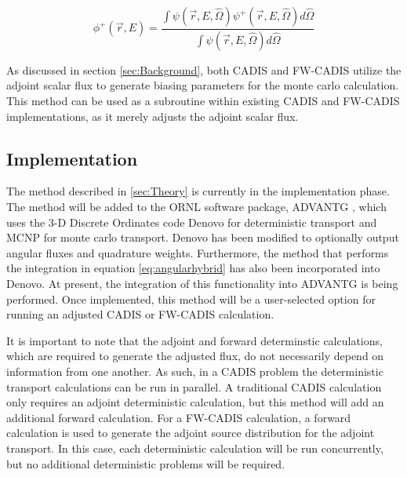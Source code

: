 \documentclass{mc2015}
\begin{document}
\begin{equation} 
\label{eq:angularhybrid}
\phi^{+}(\vec{r},E) = \frac{\int \psi(\vec {r} ,E,\hat{\Omega})\psi^+(\vec {r} ,E,\hat{\Omega})d\hat\Omega }{\int\psi(\vec {r} ,E,\hat{\Omega})d\hat\Omega}
\end{equation}

As discussed in section \ref{sec:Background}, both CADIS and FW-CADIS utilize the adjoint scalar flux to generate biasing parameters for the monte carlo calculation. 
This method can be used as a subroutine within existing CADIS and FW-CADIS implementations, as it merely adjusts the adjoint scalar flux.  

\subsection{Implementation}
\label{sec:Implement}

The method described in \ref{sec:Theory} is currently in the implementation phase. The method will be added to the ORNL software package, ADVANTG \cite{mosher_new_2010}, which uses the 3-D Discrete Ordinates code Denovo \cite{evans_denovo:_2010} for deterministic transport and MCNP \cite{brown_mcnp_2002} for monte carlo transport. Denovo has been modified to optionally output angular fluxes and quadrature weights. Furthermore, the method that performs the integration in equation \ref{eq:angularhybrid} has also been incorporated into Denovo. At present, the integration of this functionality into ADVANTG is being performed. Once implemented, this method will be a user-selected option for running an adjusted CADIS or FW-CADIS calculation. 

It is important to note that the adjoint and forward determinstic calculations, which are required to generate the adjusted flux, do not necessarily depend on information from one another. As such, in a CADIS problem the deterministic transport calculations can be run in parallel. A traditional CADIS calculation only requires an adjoint deterministic calculation, but this method will add an additional forward calculation. For a FW-CADIS calculation, a forward calculation is used to generate the adjoint source distribution for the adjoint transport. In this case, each deterministic calculation will be run concurrently, but no additional deterministic problems will be required. 
\end{document}
